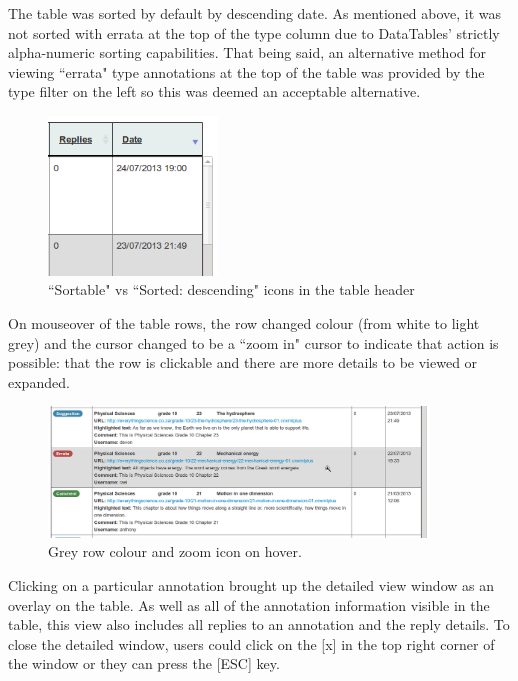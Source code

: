 The table was sorted by default by descending date.  As mentioned above, it was not sorted with errata at the top of  the type column due to DataTables' strictly alpha-numeric sorting capabilities. That being said, an alternative method for viewing ``errata" type annotations at the top of the table was provided by the type filter on the left so this was deemed an acceptable alternative. 
\begin{figure}[h!]
    \centering
    \includegraphics[width=0.4\textwidth]{Figures/V1/sorticons.png}
 \caption{``Sortable" vs ``Sorted: descending" icons in the table header}

\end{figure}

On mouseover of the table rows, the row changed colour (from white to light grey) and the cursor changed to be a ``zoom in" cursor to indicate that action is possible: that the row is clickable and there are more details to be viewed or expanded.

\begin{figure}[h!]
    \centering
    \includegraphics[width=0.9\textwidth]{Figures/V1/mouseover.png}
 \caption{Grey row colour and zoom icon on hover.}

\end{figure}

Clicking on a particular annotation brought up the detailed view window as an overlay on the table. As well as all of the annotation information visible in the table, this view also includes all replies to an annotation and the reply details. To close the detailed window, users could click on the [x] in the top right corner of the window or they can press the [ESC] key. 

